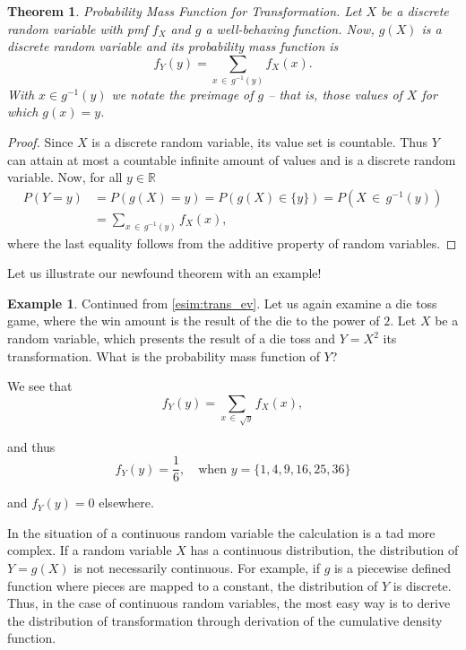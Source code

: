 \documentclass[12pt,a4paper,leqno]{report}
\theoremstyle{plain}
\newtheorem{lause}[equation]{Theorem}
\theoremstyle{definition}
\newtheorem{esim}[equation]{Example}
\begin{document}
\begin{lause}
Probability Mass Function for Transformation. Let $X$ be a discrete random variable with pmf $f_X$ and $g$ a well-behaving function. Now, $g(X)$ is a discrete random variable and its probability mass function is
\[
f_Y(y) = \sum_{x \, \in \, g^{-1}(y)}f_X(x).
\]
With $x \in g^{-1}(y)$ we notate the preimage of $g$ -- that is, those values of $X$ for which $g(x) = y$.
\end{lause}

\begin{proof}
Since $X$ is a discrete random variable, its value set is countable. Thus $Y$ can attain at most a countable infinite amount of values and is a discrete random variable. Now, for all $y \in \mathbb{R}$
\[
\begin{split}
P(Y=y) &= P(g(X)=y) = P(g(X)\in \{y\}) = P(X \, \in \, g^{-1}(y)) \\
&= \sum_{x \, \in \, g^{-1}(y)}f_X(x),
\end{split}
\]
where the last equality follows from the additive property of random variables.
\end{proof}

Let us illustrate our newfound theorem with an example!

\begin{esim}
Continued from \ref{esim:trans_ev}. Let us again examine a die toss game, where the win amount is the result of the die to the power of $2$. Let $X$ be a random variable, which presents the result of a die toss and $Y = X^2$ its transformation. What is the probability mass function of $Y$?

We see that 
\[
f_Y(y) = \sum_{x \, \in \, \sqrt{y}}f_X(x),
\]

and thus
\[
f_Y(y) = \frac{1}{6}, \quad \text{when } y = \{1,4,9,16,25,36\} 
\]

and $f_Y(y) = 0$ elsewhere.
\end{esim}

In the situation of a continuous random variable the calculation is a tad more complex. If a random variable $X$ has a continuous distribution, the distribution of $Y = g(X)$ is not necessarily continuous. For example, if $g$ is a piecewise defined function where pieces are mapped to a constant, the distribution of $Y$ is discrete. Thus, in the case of continuous random variables, the most easy way is to derive the distribution of transformation through derivation of the cumulative density function.
\end{document}
